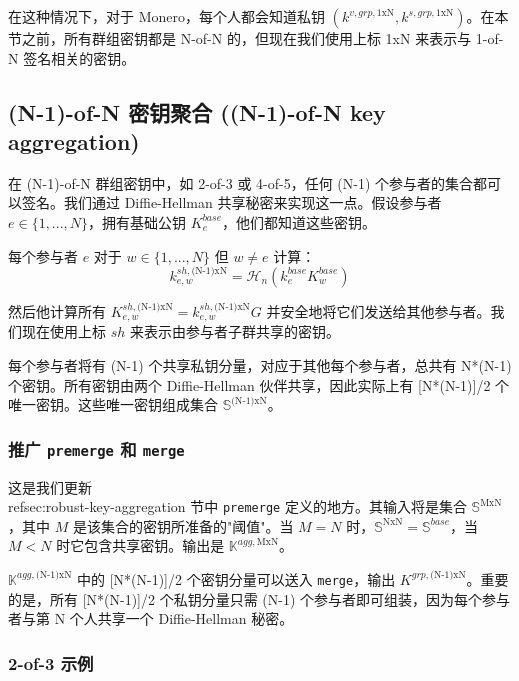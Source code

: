 在这种情况下，对于 Monero，每个人都会知道私钥 $(k^{v,grp,{1\textrm{xN}}},k^{s,grp,{1\textrm{xN}}})$。在本节之前，所有群组密钥都是 N-of-N 的，但现在我们使用上标 1xN 来表示与 1-of-N 签名相关的密钥。


\subsection{(N-1)-of-N 密钥聚合 ((N-1)-of-N key aggregation)}
\label{sec:n-1-of-n}

在 (N-1)-of-N 群组密钥中，如 2-of-3 或 4-of-5，任何 (N-1) 个参与者的集合都可以签名。我们通过 Diffie-Hellman 共享秘密来实现这一点。假设参与者 $e \in \{1,...,N\}$，拥有基础公钥 $K^{base}_e$，他们都知道这些密钥。

每个参与者 $e$ 对于 $w \in \{1,...,N\}$ 但 $w \neq e$ 计算：\vspace{.175cm}
\[k^{sh,\textrm{(N-1)xN}}_{e,w} = \mathcal{H}_n(k^{base}_e K^{base}_w)\]

然后他计算所有 $K^{sh,\textrm{(N-1)xN}}_{e,w} = k^{sh,\textrm{(N-1)xN}}_{e,w} G$ 并安全地将它们发送给其他参与者。我们现在使用上标 $sh$ 来表示由参与者子群共享的密钥。

每个参与者将有 (N-1) 个共享私钥分量，对应于其他每个参与者，总共有 N*(N-1) 个密钥。所有密钥由两个 Diffie-Hellman 伙伴共享，因此实际上有 [N*(N-1)]/2 个唯一密钥。这些唯一密钥组成集合 $\mathbb{S}^{\textrm{(N-1)xN}}$。

\subsubsection*{推广 {\tt premerge} 和 {\tt merge}}

这是我们更新 \\ref{sec:robust-key-aggregation} 节中 {\tt premerge} 定义的地方。其输入将是集合 $\mathbb{S}^{\textrm{MxN}}$，其中 $M$ 是该集合的密钥所准备的"阈值"。当 $M = N$ 时，$\mathbb{S}^{\textrm{NxN}} = \mathbb{S}^{base}$，当 $M < N$ 时它包含共享密钥。输出是 $\mathbb{K}^{agg,\textrm{MxN}}$。

$\mathbb{K}^{agg,\textrm{(N-1)xN}}$ 中的 [N*(N-1)]/2 个密钥分量可以送入 {\tt merge}，输出 $K^{grp,\textrm{(N-1)xN}}$。重要的是，所有 [N*(N-1)]/2 个私钥分量只需 (N-1) 个参与者即可组装，因为每个参与者与第 N 个人共享一个 Diffie-Hellman 秘密。

\subsubsection*{2-of-3 示例}

